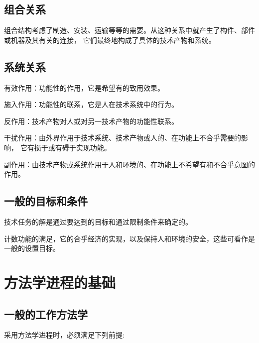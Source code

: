 \documentclass[letterpaper,10pt,english]{sphinxmanual}
\begin{document}
\subsection{组合关系}
\label{unit2:id7}
组合结构考虑了制造、安装、运输等等的需要。从这种关系中就产生了构件、部件或机器及其有关的连接，
它们最终地构成了具体的技术产物和系统。


\subsection{系统关系}
\label{unit2:id8}
有效作用：功能性的作用，它是希望有的致用效果。

施入作用：功能性的联系，它是人在技术系统中的行为。

反作用：技术产物对人或对另一技术产物的功能性联系。

干扰作用：由外界作用于技术系统、技术产物或人的、在功能上不合乎需要的影响，
它有损于或有碍于实现功能。

副作用：由技术产物或系统作用于人和环境的、在功能上不希望有和不合乎意图的作用。


\subsection{一般的目标和条件}
\label{unit2:id9}
技术任务的解是通过要达到的目标和通过限制条件来确定的。

计数功能的满足，它的合乎经济的实现，以及保持人和环境的安全，这些可看作是一般的设置目标。


\section{方法学进程的基础}
\label{unit2:id10}

\subsection{一般的工作方法学}
\label{unit2:id11}
采用方法学进程时，必须满足下列前提:
\end{document}
